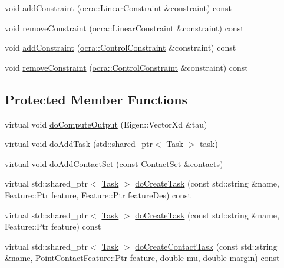 \begin{DoxyCompactItemize}
void \hyperlink{classwocra_1_1WocraController_a45b43039b1d950ba59d569f24b6e265d}{add\+Constraint} (\hyperlink{namespaceocra_ae8b87cf4099be3efc3b410019ad2046e}{ocra\+::\+Linear\+Constraint} \&constraint) const
\item 
void \hyperlink{classwocra_1_1WocraController_ac1234e8084fedc0ed39e2ee97a40a31c}{remove\+Constraint} (\hyperlink{namespaceocra_ae8b87cf4099be3efc3b410019ad2046e}{ocra\+::\+Linear\+Constraint} \&constraint) const
\item 
void \hyperlink{classwocra_1_1WocraController_af6db65f470668d19bb7fd24821f042db}{add\+Constraint} (\hyperlink{classocra_1_1ControlConstraint}{ocra\+::\+Control\+Constraint} \&constraint) const
\item 
void \hyperlink{classwocra_1_1WocraController_a9a1b55fe0392b1514a813d4f9ed413b2}{remove\+Constraint} (\hyperlink{classocra_1_1ControlConstraint}{ocra\+::\+Control\+Constraint} \&constraint) const
\end{DoxyCompactItemize}
\subsection*{Protected Member Functions}
\begin{DoxyCompactItemize}
\item 
virtual void \hyperlink{classwocra_1_1WocraController_aaf750c45d062220e3f78ccb1c8a41d07}{do\+Compute\+Output} (Eigen\+::\+Vector\+Xd \&tau)
\item 
virtual void \hyperlink{classwocra_1_1WocraController_aa9a681aa5c0f043638d4d2956c2913c1}{do\+Add\+Task} (std\+::shared\+\_\+ptr$<$ \hyperlink{classocra_1_1Task}{Task} $>$ task)
\item 
virtual void \hyperlink{classwocra_1_1WocraController_a74d8fa3103ca3787add351620c5bcf73}{do\+Add\+Contact\+Set} (const \hyperlink{classocra_1_1ContactSet}{Contact\+Set} \&contacts)
\item 
virtual std\+::shared\+\_\+ptr$<$ \hyperlink{classocra_1_1Task}{Task} $>$ \hyperlink{classwocra_1_1WocraController_a4ce73b9a7b7026427e8abf44f54155af}{do\+Create\+Task} (const std\+::string \&name, Feature\+::\+Ptr feature, Feature\+::\+Ptr feature\+Des) const
\item 
virtual std\+::shared\+\_\+ptr$<$ \hyperlink{classocra_1_1Task}{Task} $>$ \hyperlink{classwocra_1_1WocraController_a1dec71e9c2fb5b2d6fab0bcd230e9c00}{do\+Create\+Task} (const std\+::string \&name, Feature\+::\+Ptr feature) const
\item 
virtual std\+::shared\+\_\+ptr$<$ \hyperlink{classocra_1_1Task}{Task} $>$ \hyperlink{classwocra_1_1WocraController_a60caf0250523856f915785efde7d2368}{do\+Create\+Contact\+Task} (const std\+::string \&name, Point\+Contact\+Feature\+::\+Ptr feature, double mu, double margin) const
\end{DoxyCompactItemize}
